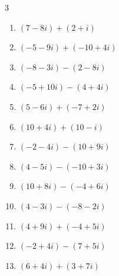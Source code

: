 \begin{multicols}{3}
\begin{enumerate}
\columnbreak %

  \item $\displaystyle (7-8i) + (2+i)$

        \phantom{$\displaystyle =9-7i$}

  \item $\displaystyle (-5-9i) + (-10+4i)$

        \phantom{$\displaystyle =-15-5i$}

  \item $\displaystyle (-8-3i) - (2-8i)$

        \phantom{$\displaystyle =-10+5i$}

  \item $\displaystyle (-5+10i) - (4+4i)$

        \phantom{$\displaystyle =-9+6i$}

  \item $\displaystyle (5-6i) + (-7+2i)$

        \phantom{$\displaystyle =-2-4i$}

  \item $\displaystyle (10+4i) + (10-i)$

        \phantom{$\displaystyle =20+3i$}

  \item $\displaystyle (-2-4i) - (10+9i)$

        \phantom{$\displaystyle =-12-13i$}

  \item $\displaystyle (4-5i) - (-10+3i)$

        \phantom{$\displaystyle =14-8i$}

  \item $\displaystyle (10+8i) - (-4+6i)$

        \phantom{$\displaystyle =14+2i$}

  \item $\displaystyle (4-3i) - (-8-2i)$

        \phantom{$\displaystyle =12-i$}

  \item $\displaystyle (4+9i) + (-4+5i)$

        \phantom{$\displaystyle =14i$}

  \item $\displaystyle (-2+4i) - (7+5i)$

        \phantom{$\displaystyle =-9-i$}

  \item $\displaystyle (6+4i) + (3+7i)$


\end{enumerate}
\end{multicols}
